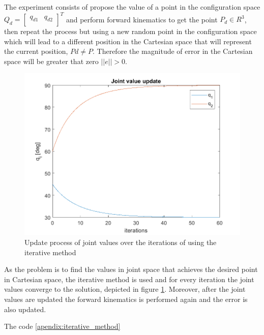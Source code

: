 The experiment consists of propose the value of a point in the configuration space $Q_d=[ \begin{array}{cc} q_{d1} & q_{d2} \\ \end{array} ]^T$ and perform forward kinematics to get the point $P_d \in R^3$, then repeat the process but using a new random point in the configuration space which will lead to a different position in the Cartesian space that will represent the current position, $Pd \neq P$. Therefore the magnitude of error in the Cartesian space will be greater that zero $||e|| > 0$.

\begin{figure}[htbp] 
\begin{center}
\includegraphics[width=\textwidth]{images/Trajectory_Joint_p3_rodrigo}
\caption{Update process of joint values over the iterations of using the iterative method}
\label{fig:part3.joint_trajectory}
\end{center}
\end{figure}

As the problem is to find the values in joint space that achieves the desired point in Cartesian space, the iterative method is used and for every iteration the joint values converge to the solution, depicted in figure \ref{fig:part3.joint_trajectory}. Moreover, after the joint values are updated the forward kinematics is performed again and the error is also updated.

The code \ref{apendix:iterative_method} 

